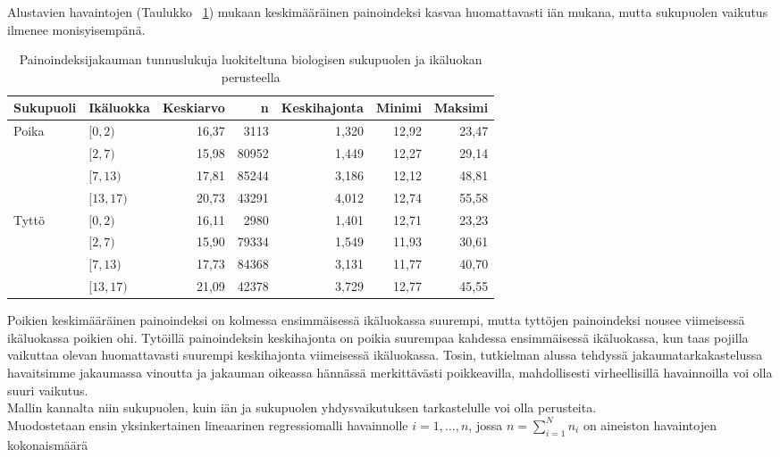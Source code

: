 \documentclass[finnish]{docopts}
\begin{document}
Alustavien havaintojen (Taulukko ~\ref{table:deskrtaulu}) mukaan keskimääräinen painoindeksi kasvaa huomattavasti iän mukana, mutta sukupuolen vaikutus ilmenee monisyisempänä.\\

\begin{table}[H]
\centering
\begin{tabular}{llrrrrr}
\toprule
Sukupuoli & Ikäluokka & Keskiarvo & n & Keskihajonta & Minimi & Maksimi\\
\midrule
Poika & $[0,2)$ & 16,37 & 3113 & 1,320 & 12,92 & 23,47\\
 & $[2,7)$ & 15,98 & 80952 & 1,449 & 12,27 & 29,14\\
 & $[7,13)$ & 17,81 & 85244 & 3,186 & 12,12 & 48,81\\
 & $[13,17)$ & 20,73 & 43291 & 4,012 & 12,74 & 55,58\\
\addlinespace
Tyttö & $[0,2)$ & 16,11 & 2980 & 1,401 & 12,71 & 23,23\\
 & $[2,7)$ & 15,90 & 79334 & 1,549 & 11,93 & 30,61\\
 & $[7,13)$ & 17,73 & 84368 & 3,131 & 11,77 & 40,70\\
 & $[13,17)$ & 21,09 & 42378 & 3,729 & 12,77 & 45,55\\
\bottomrule
\end{tabular}
\caption{Painoindeksijakauman tunnuslukuja luokiteltuna biologisen sukupuolen ja ikäluokan perusteella}
\label{table:deskrtaulu}
\end{table}

Poikien keskimääräinen painoindeksi on kolmessa ensimmäisessä ikäluokassa suurempi, mutta tyttöjen painoindeksi nousee viimeisessä ikäluokassa poikien ohi. Tytöillä painoindeksin keskihajonta on poikia suurempaa kahdessa ensimmäisessä ikäluokassa, kun taas pojilla vaikuttaa olevan huomattavasti suurempi keskihajonta viimeisessä ikäluokassa. Tosin, tutkielman alussa tehdyssä jakaumatarkakastelussa havaitsimme jakaumassa vinoutta ja jakauman oikeassa hännässä merkittävästi poikkeavilla, mahdollisesti virheellisillä havainnoilla voi olla suuri vaikutus.\\

Mallin kannalta niin sukupuolen, kuin iän ja sukupuolen yhdysvaikutuksen tarkastelulle voi olla perusteita.\\

Muodostetaan ensin yksinkertainen lineaarinen regressiomalli havainnolle $i = 1,\dots, n$, jossa $n = \sum\limits_{i = 1}^{N} n_{i}$ on aineiston havaintojen kokonaismäärä
\end{document}

